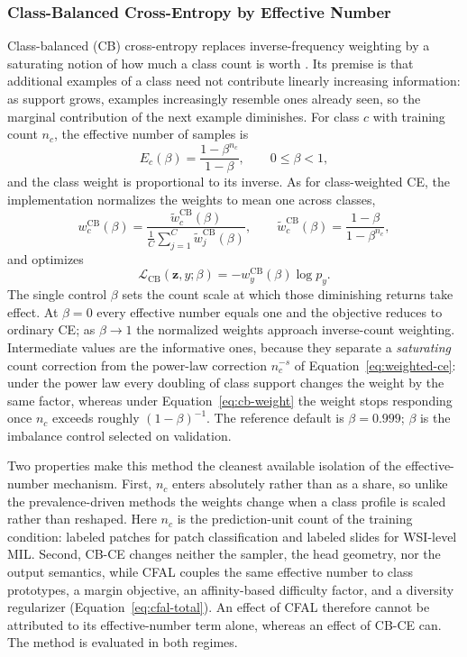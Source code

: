 \documentclass[11pt]{article}
\begin{document}
\subsubsection{Class-Balanced Cross-Entropy by Effective Number}
\label{sec:cb-ce}
Class-balanced (CB) cross-entropy replaces inverse-frequency weighting by a saturating notion of how much a class count is worth \citep{cui2019classBalanced}. Its premise is that additional examples of a class need not contribute linearly increasing information: as support grows, examples increasingly resemble ones already seen, so the marginal contribution of the next example diminishes. For class $c$ with training count $n_c$, the effective number of samples is
\begin{equation}
  E_c(\beta)=\frac{1-\beta^{n_c}}{1-\beta},
  \qquad 0\leq\beta<1,
  \label{eq:cb-effective-number}
\end{equation}
\noindent and the class weight is proportional to its inverse. As for class-weighted CE, the implementation normalizes the weights to mean one across classes,
\begin{equation}
  w_c^{\mathrm{CB}}(\beta)=
  \frac{\widetilde w_c^{\mathrm{CB}}(\beta)}
       {\frac{1}{C}\sum_{j=1}^{C}\widetilde w_j^{\mathrm{CB}}(\beta)},
  \qquad
  \widetilde w_c^{\mathrm{CB}}(\beta)=\frac{1-\beta}{1-\beta^{n_c}},
  \label{eq:cb-weight}
\end{equation}
\noindent and optimizes
\begin{equation}
  \mathcal{L}_{\mathrm{CB}}(\mathbf z,y;\beta)=-w_y^{\mathrm{CB}}(\beta)\log p_y.
  \label{eq:cb-ce}
\end{equation}
\noindent The single control $\beta$ sets the count scale at which those diminishing returns take effect. At $\beta=0$ every effective number equals one and the objective reduces to ordinary CE; as $\beta\rightarrow1$ the normalized weights approach inverse-count weighting. Intermediate values are the informative ones, because they separate a \emph{saturating} count correction from the power-law correction $n_c^{-s}$ of Equation~\eqref{eq:weighted-ce}: under the power law every doubling of class support changes the weight by the same factor, whereas under Equation~\eqref{eq:cb-weight} the weight stops responding once $n_c$ exceeds roughly $(1-\beta)^{-1}$. The reference default is $\beta=\num{0.999}$; $\beta$ is the imbalance control selected on validation.

Two properties make this method the cleanest available isolation of the effective-number mechanism. First, $n_c$ enters absolutely rather than as a share, so unlike the prevalence-driven methods the weights change when a class profile is scaled rather than reshaped. Here $n_c$ is the prediction-unit count of the training condition: labeled patches for patch classification and labeled slides for WSI-level MIL. Second, CB-CE changes neither the sampler, the head geometry, nor the output semantics, while CFAL couples the same effective number to class prototypes, a margin objective, an affinity-based difficulty factor, and a diversity regularizer (Equation~\eqref{eq:cfal-total}). An effect of CFAL therefore cannot be attributed to its effective-number term alone, whereas an effect of CB-CE can. The method is evaluated in both regimes.
\end{document}

